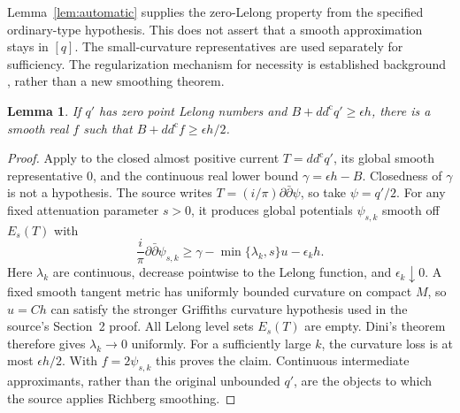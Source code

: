 \documentclass[11pt]{article}
\newtheorem{lemma}[theorem]{Lemma}
\theoremstyle{remark}
\newcommand{\ddc}{dd^{\mathrm c}}
\begin{document}
Lemma~\ref{lem:automatic} supplies the zero-Lelong property from the
specified ordinary-type hypothesis. This does not assert that a smooth
approximation stays in $[q]$. The small-curvature representatives are
used separately for sufficiency. The regularization mechanism for necessity is established
background \cite{Demailly92}, rather than a new smoothing theorem.

\begin{lemma}\label{lem:smooth}
If $q'$ has zero point Lelong numbers and
$B+\ddc q'\geq\epsilon h$, there is a smooth real $f$ such that
$B+\ddc f\geq\epsilon h/2$.
\end{lemma}
\begin{proof}
Apply \cite[Main Theorem~1.1]{Demailly92} to the closed almost positive
current $T=\ddc q'$, its global smooth representative $0$, and the
continuous real lower bound $\gamma=\epsilon h-B$. Closedness of
$\gamma$ is not a hypothesis. The source writes
$T=(i/\pi)\partial\bar\partial\psi$, so take $\psi=q'/2$.
For any fixed attenuation parameter $s>0$, it produces global potentials
$\psi_{s,k}$ smooth off $E_s(T)$ with
\[
 \frac{i}{\pi}\partial\bar\partial\psi_{s,k}
 \geq\gamma-\min\{\lambda_k,s\}u-\epsilon_k h.
\]
Here $\lambda_k$ are continuous, decrease pointwise to the Lelong function,
and $\epsilon_k\downarrow0$. A fixed smooth tangent metric has uniformly
bounded curvature on compact $M$, so $u=Ch$ can satisfy the stronger
Griffiths curvature hypothesis used in the source's Section~2 proof.
All Lelong level sets $E_s(T)$ are empty. Dini's theorem therefore gives
$\lambda_k\to0$ uniformly. For a sufficiently large $k$, the curvature
loss is at most $\epsilon h/2$. With $f=2\psi_{s,k}$ this proves the claim.
Continuous intermediate approximants, rather than the original unbounded
$q'$, are the objects to which the source applies Richberg smoothing.
\end{proof}
\end{document}
